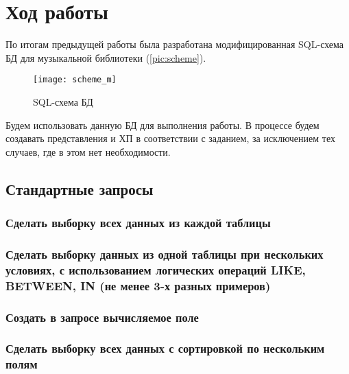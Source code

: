 \section{Ход работы}

По итогам предыдущей работы была разработана модифицированная SQL-схема БД для музыкальной библиотеки (\vref{pic:scheme}).

\begin{figure}[ht]
	\centering
	\texttt{[image: scheme\_m]}
	\caption{SQL-схема БД}
	\label{pic:scheme}
\end{figure}

Будем использовать данную БД для выполнения работы. В процессе будем создавать представления и ХП в соответствии с заданием, за исключением тех случаев, где в этом нет необходимости.

\subsection{Стандартные запросы}

\subsubsection{Сделать выборку всех данных из каждой таблицы}



\subsubsection{Сделать выборку данных из одной таблицы при нескольких условиях, с использованием логических операций LIKE, BETWEEN, IN (не менее 3-х разных примеров)}



\subsubsection{Создать в запросе вычисляемое поле}



\subsubsection{Сделать выборку всех данных с сортировкой по нескольким полям}

